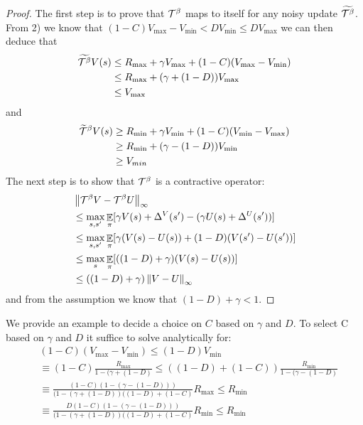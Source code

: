\begin{proof}
The first step is to prove that $\mathcal{T}^{\beta}$ maps to itself for any noisy update $\widetilde{\mathcal{T}^{\beta}}$. 
From 2) we know that
$(1-C) V_{\max} - V_{\min} < D V_{\min} \leq D V_{\max}$ we can then deduce that
\begin{equation}
    \begin{split}
        \widetilde{\mathcal{T}^{\beta}}V(s) &\leq R_{\max} + \gamma V_{\max} +(1-C)(V_{\max} - V_{\min}) \\
        &\leq R_{\max} + (\gamma+(1-D)) V_{\max} \\
        &\leq V_{\max}
    \end{split}
\end{equation}
and
\begin{equation}
    \begin{split}
        \widetilde{\mathcal{T}}^{\beta}V(s) &\geq R_{\min} + \gamma V_{\min} + (1-C)(V_{\min} - V_{\max})\\
        &\geq R_{\min} + (\gamma-(1-D)) V_{\min}\\
        &\geq V_{min}\\
    \end{split}
\end{equation}
The next step is to show that $\mathcal{T}^{\beta}$ is a contractive operator:
\begin{equation}
\begin{split}
    &\left\lVert\mathcal{T}^{\beta}V - \mathcal{T}^{\beta}U\right\rVert_{\infty}\\
    &\leq \max_{s,s'}\mathop{\mathbb{E}}_{\pi}[\gamma V(s) + \Delta^V(s') - (\gamma U(s) + \Delta^U(s'))] \\
    &\leq \max_{s,s'}\mathop{\mathbb{E}}_{\pi}[\gamma (V(s)-U(s)) + (1-D)(V(s') -U(s'))]\\
    &\leq \max_{s}\mathop{\mathbb{E}}_{\pi}[((1-D)+\gamma)(V(s) - U(s))]\\
    &\leq ((1-D)+\gamma) \left\lVert V - U\right\rVert_{\infty}
\end{split}
\end{equation}
and from the assumption we know that $(1-D)+\gamma < 1$.
\end{proof}
 We provide an example to decide a choice on $C$ based on $\gamma$ and $D$.
 To select C based on $\gamma$ and $D$ it suffice to solve analytically for:
\begin{equation}
\begin{split}
    &(1-C)(V_{\max} - V_{\min}) \leq (1-D)V_{\min} \\
    &\equiv (1-C)\frac{R_{\max}}{1-(\gamma + (1-D)} \leq ((1-D)+(1-C)) \frac{R_{\min}}{1-(\gamma - (1-D)}\\
    &\equiv \frac{(1-C)(1-(\gamma-(1-D)))}{(1-(\gamma + (1-D))((1-D)+(1-C)} R_{\max}\leq R_{\min} \\
    &\equiv \frac{D(1-C)(1-(\gamma-(1-D)))}{(1-(\gamma + (1-D))((1-D)+(1-C)} R_{\min} \leq R_{\min}
\end{split}
\end{equation}
